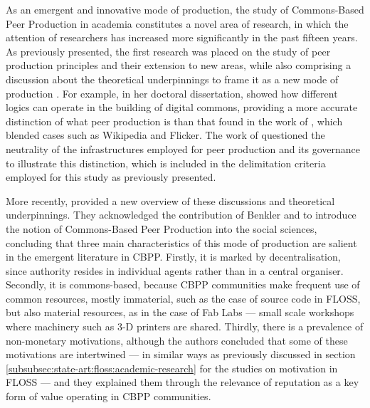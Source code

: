 As an emergent and innovative mode of production, the study of Commons-Based Peer Production in academia constitutes a novel area of research, in which the attention of researchers has increased more significantly in the past fifteen years. As previously presented, the first research was placed on the study of peer production principles and their extension to new areas, while also comprising a discussion about the theoretical underpinnings to frame it as a new mode of production \parencite[e.g.][]{Benkler2002, bauwens2005political, benkler2006wealth, fuster2010governance, bauwens2014communism}. For example, in her doctoral dissertation, \textcite{fuster2010governance} showed how different logics can operate in the building of digital commons, providing a more accurate distinction of what peer production is than that found in the work of \textcite{benkler2006wealth}, which blended cases such as Wikipedia and Flicker. The work of \textcite{fuster2010governance} questioned the neutrality of the infrastructures employed for peer production and its governance to illustrate this distinction, which is included in the delimitation criteria employed for this study as previously presented.

More recently, \textcite{arvidssoncommons} provided a new overview of these discussions and theoretical underpinnings. They acknowledged the contribution of Benkler and \textcite{bauwens2005political} to introduce the notion of Commons-Based Peer Production into the social sciences, concluding that three main characteristics of this mode of production are salient in the emergent literature in CBPP. Firstly, it is marked by decentralisation, since authority resides in individual agents rather than in a central organiser. Secondly, it is commons-based, because CBPP communities make frequent use of common resources, mostly immaterial, such as the case of source code in FLOSS, but also material resources, as in the case of Fab Labs --- small scale workshops where machinery such as 3-D printers are shared. Thirdly, there is a prevalence of non-monetary motivations, although the authors concluded that some of these motivations are intertwined --- in similar ways as previously discussed in section \ref{subsubsec:state-art:floss:academic-research} for the studies on motivation in FLOSS --- and they explained them through the relevance of reputation as a key form of value operating in CBPP communities.

